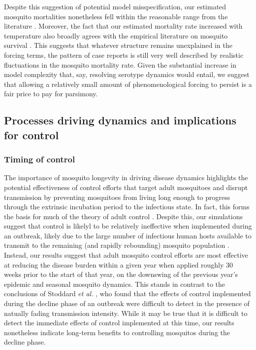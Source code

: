 \documentclass[10pt,letterpaper]{article}
\begin{document}
Despite this suggestion of potential model misspecification, our estimated mosquito mortalities nonetheless fell within the reasonable range from the literature \cite{Maciel-de-Freitas2008, Brady2013}.
Moreover, the fact that our estimated mortality rate increased with temperature also broadly agrees with the empirical literature on mosquito survival \cite{Yang2009, Brady2013}.
This suggests that whatever structure remains unexplained in the forcing terms, the pattern of case reports is still very well described by realistic fluctuations in the mosquito mortality rate.
Given the substantial increase in model complexity that, say, resolving serotype dynamics would entail, we suggest that allowing a relatively small amount of phenomenological forcing to persist is a fair price to pay for parsimony.

\subsection*{Processes driving dynamics and implications for control}

\subsubsection{Timing of control}

The importance of mosquito longevity in driving disease dynamics highlights the potential effectiveness of control efforts that target adult mosquitoes and disrupt transmission by preventing mosquitoes from living long enough to progress through the extrinsic incubation period to the infectious state.
In fact, this forms the basis for much of the theory of adult control \cite{Burattini2008, Morrison2008, Smith2012}.
Despite this, our simulations suggest that control is likelyl to be relatively ineffective when implemented during an outbreak, likely due to the large number of infectious human hosts available to transmit to the remaining (and rapidly rebounding) mosquito population \cite{Newton1992, Burattini2008}.
Instead, our results suggest that adult mosquito control efforts are most effective at reducing the disease burden within a given year when applied roughly 30 weeks prior to the start of that year, on the downswing of the previous year's epidemic and seasonal mosquito dynamics.
This stands in contrast to the conclusions of Stoddard \emph{et al.} \cite{Stoddard2014}, who found that the effects of control implemented during the decline phase of an outbreak were difficult to detect in the presence of natually fading transmission intensity.
While it may be true that it is difficult to detect the immediate effects of control implemented at this time, our results nonetheless indicate long-term benefits to controlling mosquitos during the decline phase.
\end{document}
